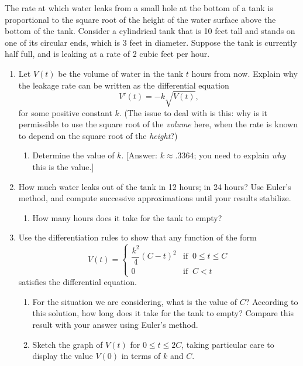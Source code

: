 	The rate at which water leaks from a small hole at the bottom of a tank is proportional to the square root of the height of the water surface above the bottom of the tank.  Consider a cylindrical tank that is 10 feet tall and stands on one of its circular ends, which is 3 feet in diameter. Suppose the tank is currently half full, and is leaking at a rate of 2 cubic feet per hour.


\begin{enumerate}
\item Let $V(t)$ be the volume of water in the tank $t$ hours from now.  Explain why the leakage rate can be written as the differential equation
	\[
V'(t) = -k\sqrt{V(t)},
\]
for some positive constant $k$.  (The issue to deal with is this: why is it permissible to use the square root of the {\em volume\/} here, when the rate is known to depend on the square root of the {\em height\/}?)


  \begin{enumerate}
  \item Determine the value of $k$.  [Answer: $k \approx .3364$; you need to explain {\em why\/} this is the value.]


\end{enumerate}
\item How much water leaks out of the tank in 12 hours; in 24 hours?  Use Euler's method, and compute successive approximations until your results stabilize.

  \begin{enumerate}
  \item How many hours does it take for the tank to empty?


\end{enumerate}
\item Use the differentiation rules to show that any function of the form
	\[
V(t) = \left\{ 
		\begin{array}{ll}
		\dfrac {{k^2}}{4} (C - t)^2 & 
			\mbox{if }\ 0 \leq t \leq C \\[.13in]
		0 &  \mbox{if }\ C < t
		\end{array}
	\right.
\]
satisfies the differential equation.

  \begin{enumerate}
  \item For the situation we are considering, what is the value of $C$?  According to this solution, how long does it take for the tank to empty?  Compare this result with your answer using Euler's method.

  \item Sketch the graph of $V(t)$ for $0 \leq t \leq 2C$, taking particular care to display the value $V(0)$ in terms of $k$ and $C$.
\label{leaking tank-end}

\end{enumerate}
\end{enumerate}
